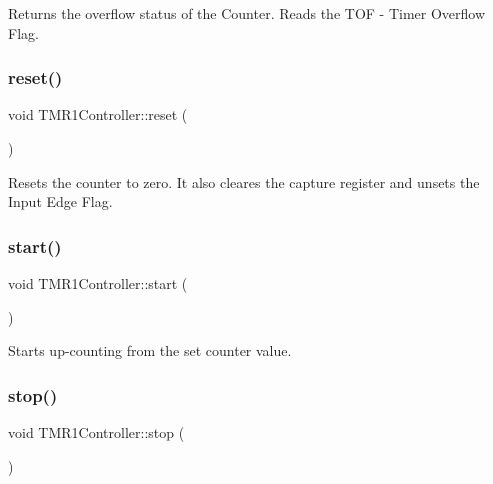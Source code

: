 Returns the overflow status of the Counter. Reads the T\+OF -\/ Timer Overflow Flag. 

\mbox{\label{classTMR1Controller_adf3746ffd24c5b55abff4fa18e05f6b3}} 
\subsubsection{\texorpdfstring{reset()}{reset()}}
{\footnotesize\ttfamily void T\+M\+R1\+Controller\+::reset (\begin{DoxyParamCaption}{ }\end{DoxyParamCaption})\hspace{0.3cm}{\ttfamily [inline]}}



Resets the counter to zero. It also cleares the capture register and unsets the Input Edge Flag. 

\mbox{\label{classTMR1Controller_a67bc04f0648176a681f6ac01ea483db9}} 
\subsubsection{\texorpdfstring{start()}{start()}}
{\footnotesize\ttfamily void T\+M\+R1\+Controller\+::start (\begin{DoxyParamCaption}{ }\end{DoxyParamCaption})\hspace{0.3cm}{\ttfamily [inline]}}



Starts up-\/counting from the set counter value. 

\mbox{\label{classTMR1Controller_afcb0ea27107bfbe50b9dcbd54207dd00}} 
\subsubsection{\texorpdfstring{stop()}{stop()}}
{\footnotesize\ttfamily void T\+M\+R1\+Controller\+::stop (\begin{DoxyParamCaption}{ }\end{DoxyParamCaption})\hspace{0.3cm}{\ttfamily [inline]}}



